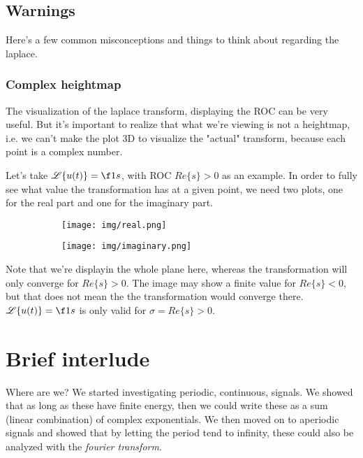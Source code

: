 \documentclass{article}
\newcommand{\0}{{\mathbf{0}}}
\begin{document}
\clearpage
\subsection{Warnings}
Here's a few common misconceptions and things to think about regarding the laplace.


\subsubsection{Complex heightmap}
The visualization of the laplace transform, displaying the ROC can be very useful. But it's important to realize
that what we're viewing is not a heightmap, i.e. we can't make the plot 3D to visualize the "actual" transform,
because each point is a complex number.

Let's take $\mathscr{L}\{ u(t) \} = \f 1s$, with ROC $Re\{ s \} > 0$ as an example.
In order to fully see what value the transformation has at a given point, we need
two plots, one for the real part and one for the imaginary part.

\begin{figure}[h!]
  \centering
  \begin{subfigure}[b]{0.4\textwidth}
    \texttt{[image: img/real.png]}
  \end{subfigure}%
  \begin{subfigure}[b]{0.4\textwidth}
    \texttt{[image: img/imaginary.png]}
  \end{subfigure}
\end{figure}

Note that we're displayin the whole plane here, whereas the transformation will only converge for $Re\{ s \}>0$. The image may show a finite value for $Re\{ s \} < 0$, but that does
not mean the the transformation would converge there. $\mathscr{L}\{ u(t) \} = \f 1s$ is only valid for $\sigma = Re\{ s \}>0$.



\clearpage
\section{Brief interlude}
Where are we? We started investigating periodic, continuous, signals. We showed that as long as these have finite energy,
then we could write these as a sum (linear combination) of complex exponentials. We then moved on to aperiodic signals
and showed that by letting the period tend to infinity, these could also be analyzed with the \textit{fourier transform}.
\end{document}
